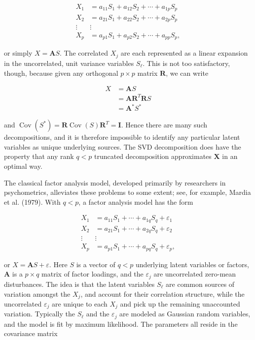 \documentclass[10pt]{article}
\begin{document}
\begin{align*}
X_{1} & =a_{11} S_{1}+a_{12} S_{2}+\cdots+a_{1 p} S_{p} \\
X_{2} & =a_{21} S_{1}+a_{22} S_{2}+\cdots+a_{2 p} S_{p} \\
\vdots & \vdots  \tag{14.78}\\
X_{p} & =a_{p 1} S_{1}+a_{p 2} S_{2}+\cdots+a_{p p} S_{p},
\end{align*}


or simply $X=\mathbf{A} S$. The correlated $X_{j}$ are each represented as a linear expansion in the uncorrelated, unit variance variables $S_{\ell}$. This is not too satisfactory, though, because given any orthogonal $p \times p$ matrix $\mathbf{R}$, we can write


\begin{align*}
X & =\mathbf{A} S \\
& =\mathbf{A R}^{T} \mathbf{R} S \\
& =\mathbf{A}^{*} S^{*} \tag{14.79}
\end{align*}


and $\operatorname{Cov}\left(S^{*}\right)=\mathbf{R} \operatorname{Cov}(S) \mathbf{R}^{T}=\mathbf{I}$. Hence there are many such decompositions, and it is therefore impossible to identify any particular latent variables as unique underlying sources. The SVD decomposition does have the property that any rank $q<p$ truncated decomposition approximates $\mathbf{X}$ in an optimal way.

The classical factor analysis model, developed primarily by researchers in psychometrics, alleviates these problems to some extent; see, for example, Mardia et al. (1979). With $q<p$, a factor analysis model has the form


\begin{align*}
X_{1} & =a_{11} S_{1}+\cdots+a_{1 q} S_{q}+\varepsilon_{1} \\
X_{2} & =a_{21} S_{1}+\cdots+a_{2 q} S_{q}+\varepsilon_{2} \\
\vdots & \vdots  \tag{14.80}\\
X_{p} & =a_{p 1} S_{1}+\cdots+a_{p q} S_{q}+\varepsilon_{p},
\end{align*}


or $X=\mathbf{A} S+\varepsilon$. Here $S$ is a vector of $q<p$ underlying latent variables or factors, $\mathbf{A}$ is a $p \times q$ matrix of factor loadings, and the $\varepsilon_{j}$ are uncorrelated zero-mean disturbances. The idea is that the latent variables $S_{\ell}$ are common sources of variation amongst the $X_{j}$, and account for their correlation structure, while the uncorrelated $\varepsilon_{j}$ are unique to each $X_{j}$ and pick up the remaining unaccounted variation. Typically the $S_{\ell}$ and the $\varepsilon_{j}$ are modeled as Gaussian random variables, and the model is fit by maximum likelihood. The parameters all reside in the covariance matrix
\end{document}
